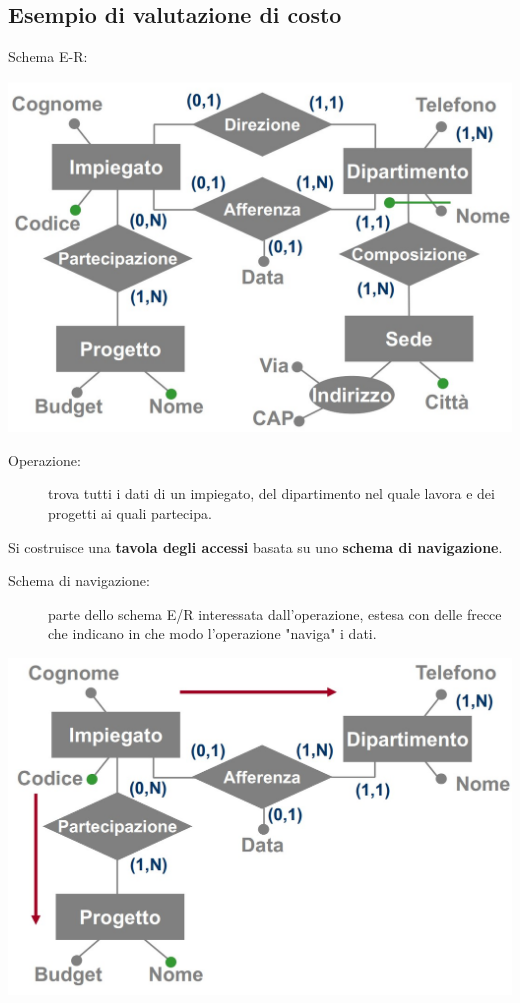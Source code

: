 \subsection{Esempio di valutazione di costo}
Schema E-R:
\begin{center}
    \includegraphics[scale=0.675]{chaptersLezioniSara/img/PLog_tavolaAccessi_es3a.jpg}
\end{center}
\begin{description}
    \item[Operazione:] trova tutti i dati di un impiegato, del dipartimento nel quale lavora e dei progetti ai quali partecipa.
\end{description}
Si costruisce una \textbf{tavola degli accessi} basata su uno \textbf{schema di navigazione}.
\begin{description}
    \item[Schema di navigazione:] parte dello schema E/R interessata dall'operazione, estesa con delle frecce che indicano in che modo l'operazione "naviga" i dati.
\end{description}
\begin{center}
    \includegraphics[scale=0.675]{chaptersLezioniSara/img/PLog_tavolaAccessi_es3b.jpg}
\end{center}
